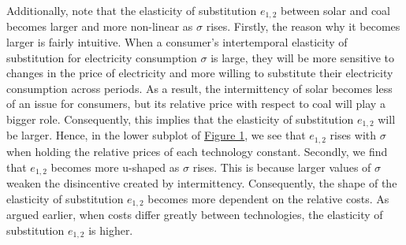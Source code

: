 \documentclass[11pt,a4paper]{extarticle}
\begin{document}

Additionally, note that the elasticity of substitution $e_{1,2}$ between solar and coal becomes larger and more non-linear as $\sigma$ rises. Firstly, the reason why  it becomes larger is fairly intuitive. When a consumer's intertemporal elasticity of substitution for electricity consumption $\sigma$ is large, they will be more sensitive to changes in the price of electricity and more willing to substitute their electricity consumption across periods. As a result, the intermittency of solar becomes less of an  issue for consumers, but its relative price with respect to coal will play a bigger role. Consequently, this implies that the elasticity of substitution $e_{1, 2}$ will be larger. Hence, in the lower subplot of \hyperref[fig:eosnum]{Figure 1}, we see that $e_{1, 2}$ rises with $\sigma$ when holding the  relative prices of each technology constant. Secondly, we find that $e_{1,2}$ becomes more u-shaped as $\sigma$ rises. This is because larger values of $\sigma$ weaken the disincentive created by intermittency. Consequently, the shape of the elasticity of substitution $e_{1,2}$ becomes more dependent on the relative costs. As argued earlier, when costs differ greatly between technologies, the elasticity of substitution $e_{1,2}$ is higher.
\end{document}
